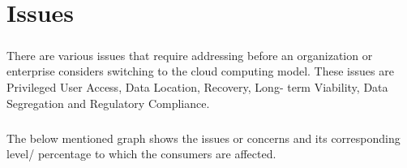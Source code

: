 \chapter{Issues}
\paragraph{\hspace{24pt}}
There are various issues that require addressing before an organization or enterprise considers switching to the cloud computing model. These issues are Privileged User Access, Data Location, Recovery, Long- term Viability, Data Segregation and Regulatory Compliance.

\paragraph{\hspace{24pt}}
The below mentioned graph shows the issues or concerns and its corresponding level/ percentage to which the consumers are affected.